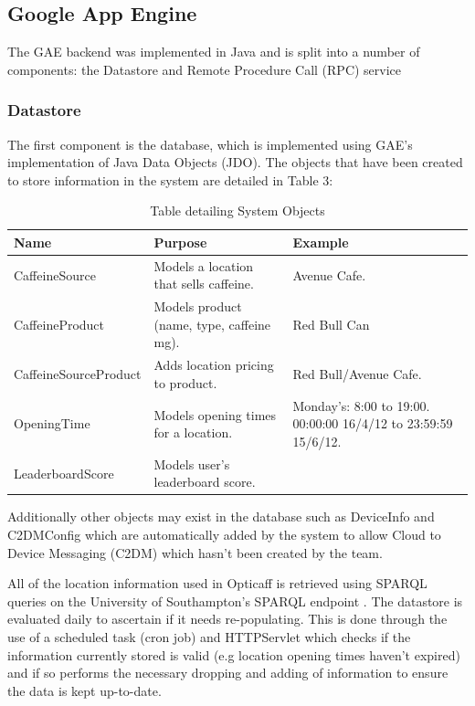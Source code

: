 \subsection{Google App Engine}
The GAE backend was implemented in Java and is split into a number of components: the Datastore and Remote Procedure Call (RPC) service

\subsubsection{Datastore}
The first component is the database, which is implemented using GAE’s implementation of Java Data Objects (JDO). 
The objects that have been created to store information in the system are detailed in Table 3:

\begin{table}[!ht]
\caption{Table detailing System Objects}
\begin{tabular}{|p{106pt}|p{200pt}|p{118pt}|}
\hline
	Name			
	& Purpose		 									
	& Example	
\\\hline
	CaffeineSource		
	& Models a location that sells caffeine.	
	& Avenue Cafe.
\\\hline
	CaffeineProduct	
	& Models product (name, type, caffeine mg).
	& Red Bull Can
\\\hline
	CaffeineSourceProduct	
	& Adds location pricing to product. 
	& Red Bull/Avenue Cafe.
\\\hline
	OpeningTime		
	& Models opening times for a location.	
	& Monday’s: 8:00 to 19:00. 00:00:00 16/4/12 to 23:59:59 15/6/12. 
\\\hline
	LeaderboardScore	
	& Models user's leaderboard score.	
	&
\\\hline
\end{tabular}
\end{table}

Additionally other objects may exist in the database such as DeviceInfo and C2DMConfig which are automatically added by the system to allow Cloud to Device Messaging (C2DM) which hasn't been created by the team. 

All of the location information used in Opticaff is retrieved using SPARQL queries on the University of Southampton’s SPARQL endpoint \cite{SotonSparql}. The datastore is evaluated daily to ascertain if it needs re-populating. This is done through the use of a scheduled task (cron job) and HTTPServlet which checks if the information currently stored is valid (e.g location opening times haven't expired) and if so performs the necessary dropping and adding of information to ensure the data is kept up-to-date.

